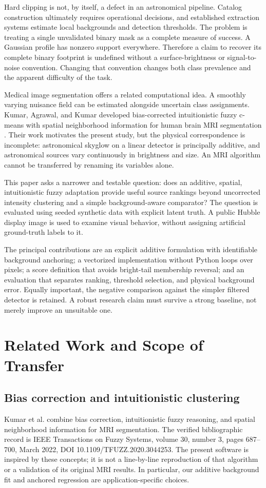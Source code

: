\documentclass[conference]{IEEEtran}
\begin{document}
Hard clipping is not, by itself, a defect in an astronomical pipeline. Catalog construction ultimately requires operational decisions, and established extraction systems estimate local backgrounds and detection thresholds. The problem is treating a single unvalidated binary mask as a complete measure of success. A Gaussian profile has nonzero support everywhere. Therefore a claim to recover its complete binary footprint is undefined without a surface-brightness or signal-to-noise convention. Changing that convention changes both class prevalence and the apparent difficulty of the task.

Medical image segmentation offers a related computational idea. A smoothly varying nuisance field can be estimated alongside uncertain class assignments. Kumar, Agrawal, and Kumar developed bias-corrected intuitionistic fuzzy c-means with spatial neighborhood information for human brain MRI segmentation \cite{kumar}. Their work motivates the present study, but the physical correspondence is incomplete: astronomical skyglow on a linear detector is principally additive, and astronomical sources vary continuously in brightness and size. An MRI algorithm cannot be transferred by renaming its variables alone.

This paper asks a narrower and testable question: does an additive, spatial, intuitionistic fuzzy adaptation provide useful source rankings beyond uncorrected intensity clustering and a simple background-aware comparator? The question is evaluated using seeded synthetic data with explicit latent truth. A public Hubble display image is used to examine visual behavior, without assigning artificial ground-truth labels to it.

The principal contributions are an explicit additive formulation with identifiable background anchoring; a vectorized implementation without Python loops over pixels; a score definition that avoids bright-tail membership reversal; and an evaluation that separates ranking, threshold selection, and physical background error. Equally important, the negative comparison against the simpler filtered detector is retained. A robust research claim must survive a strong baseline, not merely improve an unsuitable one.

\section{Related Work and Scope of Transfer}
\subsection{Bias correction and intuitionistic clustering}
Kumar et al. \cite{kumar} combine bias correction, intuitionistic fuzzy reasoning, and spatial neighborhood information for MRI segmentation. The verified bibliographic record is IEEE Transactions on Fuzzy Systems, volume 30, number 3, pages 687--700, March 2022, DOI 10.1109/TFUZZ.2020.3044253. The present software is inspired by these concepts; it is not a line-by-line reproduction of that algorithm or a validation of its original MRI results. In particular, our additive background fit and anchored regression are application-specific choices.
\end{document}
